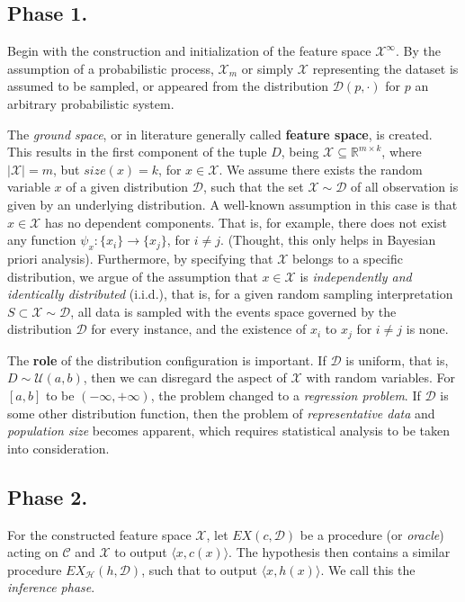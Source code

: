 \documentclass[
  journal=largetwo,
  year=2025,
  volume=37,
]{cup-journal}
\begin{document}
\subsection*{Phase 1.}
Begin with the construction and initialization of the feature space $\mathcal{X}^{\infty}$. By the assumption of a probabilistic process, $\mathcal{X}_{m}$ or simply $\mathcal{X}$ representing the dataset is assumed to be sampled, or appeared from the distribution $\mathcal{D}(p,\cdot)$ for $p$ an arbitrary probabilistic system. 

The \textit{ground space}, or in literature generally called \textbf{feature space}, is created. This results in the first component of the tuple $D$, being $\mathcal{X}\subseteq \mathbb{R}^{m\times k}$, where $\lvert \mathcal{X} \rvert=m$, but $size(x)=k$, for $x\in\mathcal{X}$. We assume there exists the random variable $x$ of a given distribution $\mathcal{D}$, such that the set $\mathcal{X}\sim \mathcal{D}$ of all observation is given by an underlying distribution. A well-known assumption in this case is that $x\in\mathcal{X}$ has no dependent components. That is, for example, there does not exist any function $\psi_{x}: \{ x_{i} \}\to \{ x_{j} \}$, for $i\neq j$. (Thought, this only helps in Bayesian priori analysis). Furthermore, by specifying that $\mathcal{X}$ belongs to a specific distribution, we argue of the assumption that $x\in\mathcal{X}$ is \textit{independently and identically distributed} (i.i.d.), that is, for a given random sampling interpretation $S\subset\mathcal{X}\sim \mathcal{D}$, all data is sampled with the events space governed by the distribution $\mathcal{D}$ for every instance, and the existence of $x_{i}$ to $x_{j}$ for $i\neq j$ is none. 

The \textbf{role} of the distribution configuration is important. If $\mathcal{D}$ is uniform, that is, $D\sim \mathcal{U}(a,b)$, then we can disregard the aspect of $\mathcal{X}$ with random variables. For $[a,b]$ to be $(-\infty,+\infty)$, the problem changed to a \textit{regression problem}. If $\mathcal{D}$ is some other distribution function, then the problem of \textit{representative data} and \textit{population size} becomes apparent, which requires statistical analysis to be taken into consideration. 
\subsection*{Phase 2.}
For the constructed feature space $\mathcal{X}$, let $EX(c,\mathcal{D})$ be a procedure (or \textit{oracle}) acting on $\mathcal{C}$ and $\mathcal{X}$ to output $\langle x,c(x)\rangle$. The hypothesis then contains a similar procedure $EX_{\mathcal{H}}(h,\mathcal{D})$, such that to output $\langle x,h(x)\rangle$. We call this the \textit{inference phase}. 
    
\end{document}
